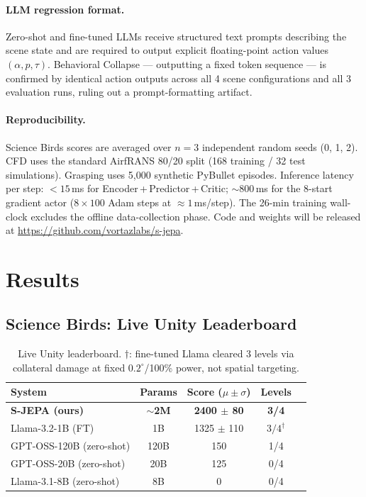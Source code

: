 \documentclass[10pt,twocolumn]{article}
\begin{document}
\paragraph{LLM regression format.}
Zero-shot and fine-tuned LLMs receive structured text prompts describing the scene state
and are required to output explicit floating-point action values $(\alpha, p, \tau)$.
Behavioral Collapse — outputting a fixed token sequence — is confirmed by identical action
outputs across all 4 scene configurations and all 3 evaluation runs, ruling out a
prompt-formatting artifact.

\paragraph{Reproducibility.}
Science Birds scores are averaged over $n{=}3$ independent random seeds (0, 1, 2).
CFD uses the standard AirfRANS 80/20 split (168 training / 32 test simulations).
Grasping uses 5{,}000 synthetic PyBullet episodes.
Inference latency per step: $<15$\,ms for Encoder\,+\,Predictor\,+\,Critic;
${\sim}800$\,ms for the 8-start gradient actor ($8 \times 100$ Adam steps at
${\approx}1$\,ms/step).
The 26-min training wall-clock excludes the offline data-collection phase.
Code and weights will be released at \url{https://github.com/vortazlabs/s-jepa}.

\section{Results}
\label{sec:results}

\subsection{Science Birds: Live Unity Leaderboard}

\begin{table}[h]
\centering
\small
\setlength{\tabcolsep}{3pt}
\begin{tabular}{lcccc}
\toprule
System & Params & Score ($\mu \pm \sigma$) & Levels \\
\midrule
\textbf{S-JEPA (ours)} & \textbf{$\sim$2M} & \textbf{2400 $\pm$ 80} & \textbf{3/4} \\
Llama-3.2-1B (FT) & 1B & 1325 $\pm$ 110 & $3/4^{\dagger}$ \\
GPT-OSS-120B (zero-shot) & 120B & 150 & 1/4 \\
GPT-OSS-20B (zero-shot) & 20B & 125 & 0/4 \\
Llama-3.1-8B (zero-shot) & 8B & 0 & 0/4 \\
\bottomrule
\end{tabular}
\caption{Live Unity leaderboard. $\dagger$: fine-tuned Llama cleared 3 levels via
collateral damage at fixed $0.2^\circ$/100\% power, not spatial targeting.}
\label{tab:sb}
\end{table}
\end{document}

